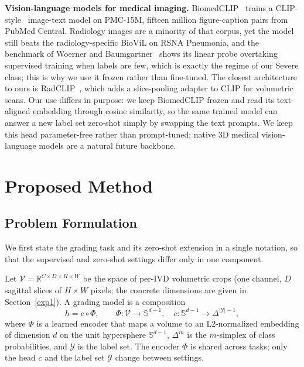 \documentclass[runningheads]{llncs}
\begin{document}
\textbf{Vision-language models for medical imaging.}
BiomedCLIP~\cite{zhang2023biomedclip} trains a CLIP-style~\cite{radford2021clip} image-text model on PMC-15M, fifteen million figure-caption pairs from PubMed Central. Radiology images are a minority of that corpus, yet the model still beats the radiology-specific BioViL on RSNA Pneumonia, and the benchmark of Woerner and Baumgartner~\cite{datascarcity2024} shows its linear probe overtaking supervised training when labels are few, which is exactly the regime of our Severe class; this is why we use it frozen rather than fine-tuned. The closest architecture to ours is RadCLIP~\cite{lu2024radclip}, which adds a slice-pooling adapter to CLIP for volumetric scans. Our use differs in purpose: we keep BiomedCLIP frozen and read its text-aligned embedding through cosine similarity, so the same trained model can answer a new label set zero-shot simply by swapping the text prompts. We keep this head parameter-free rather than prompt-tuned; native 3D medical vision-language models are a natural future backbone.

\section{Proposed Method}\label{sec3}

\subsection{Problem Formulation}\label{sec:formulation}

We first state the grading task and its zero-shot extension in a single notation, so that the supervised and zero-shot settings differ only in one component.

Let $\mathcal{V} = \mathbb{R}^{C \times D \times H \times W}$ be the space of per-IVD volumetric crops (one channel, $D$ sagittal slices of $H \times W$ pixels; the concrete dimensions are given in Section~\ref{exp1}). A grading model is a composition
\begin{equation}
h = c \circ \Phi, \qquad \Phi : \mathcal{V} \to \mathbb{S}^{d-1}, \quad c : \mathbb{S}^{d-1} \to \Delta^{|\mathcal{Y}|-1},
\label{eq:composition}
\end{equation}
where $\Phi$ is a learned encoder that maps a volume to an L2-normalized embedding of dimension $d$ on the unit hypersphere $\mathbb{S}^{d-1}$, $\Delta^{m}$ is the $m$-simplex of class probabilities, and $\mathcal{Y}$ is the label set. The encoder $\Phi$ is shared across tasks; only the head $c$ and the label set $\mathcal{Y}$ change between settings.
\end{document}
